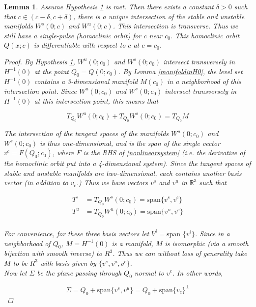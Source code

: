 \documentclass[12pt]{article}
\def\R{{\mathbb R}}
\newtheorem{lemma}{Lemma}
\begin{document}
\begin{lemma}\label{transverseint}
Assume Hypothesis \ref{transverseint} is met. Then there exists a constant $\delta > 0$ such that $c \in (c - \delta, c + \delta)$, there is a unique intersection of the stable and unstable manifolds $W^s(0; c)$ and $W^u(0; c)$. This intersection is transverse. Thus we still have a single-pulse (homoclinic orbit) for $c$ near $c_0$. This homoclinic orbit $Q(x; c)$ is differentiable with respect to $c$ at $c = c_0$.
\begin{proof}

By Hypothesis \ref{transverseint}, $W^u(0; c_0)$ and $W^s(0; c_0)$ intersect transversely in $H^{-1}(0)$ at the point $Q_0 = Q(0; c_0)$. By Lemma \ref{manifoldinH0}, the level set $H^{-1}(0)$ contains a 3-dimensional manifold $M(c_0)$ in a neighborhood of this intersection point. Since $W^u(0; c_0)$ and $W^s(0; c_0)$ intersect transversely in $H^{-1}(0)$ at this intersection point, this means that

\[
T_{Q_0} W^u(0; c_0) + T_{Q_0} W^s(0; c_0) = T_{Q_0} M
\]

The intersection of the tangent spaces of the manifolds $W^u(0; c_0)$ and $W^s(0; c_0)$ is thus one-dimensional, and is the span of the single vector $v^c = F(Q_0; c_0)$, where $F$ is the RHS of \eqref{nonlinearsystem} (i.e. the derivative of the homoclinic orbit put into a 4-dimensional system). Since the tangent spaces of stable and unstable manifolds are two-dimensional, each contains another basis vector (in addition to $v_c$.) Thus we have vectors $v^s$ and $v^u$ in $\R^3$ such that

\begin{align*}
T^s &= T_{Q_0} W^s(0; c_0) = \text{span}\{ v^s, v^c \} \\
T^u &= T_{Q_0} W^u(0; c_0) = \text{span}\{ v^u, v^c \} \\
\end{align*}

For convenience, for these three basis vectors let $V^i = \text{span }\{v^i\}$. Since in a neighborhood of $Q_0$, $M = H^{-1}(0)$ is a manifold, $M$ is isomorphic (via a smooth bijection with smooth inverse) to $R^3$. Thus we can without loss of generality take $M$ to be $R^3$ with basis given by $\{v^s, v^u, v^c\}$. \\

Now let $\Sigma$ be the plane passing through $Q_0$ normal to $v^c$. In other words, 

\[
\Sigma = Q_0 + \text{span}\{ v^s, v^u \} = Q_0 + \text{span}\{v_c\}^\perp
\]


\end{proof}
\end{lemma}
\end{document}
